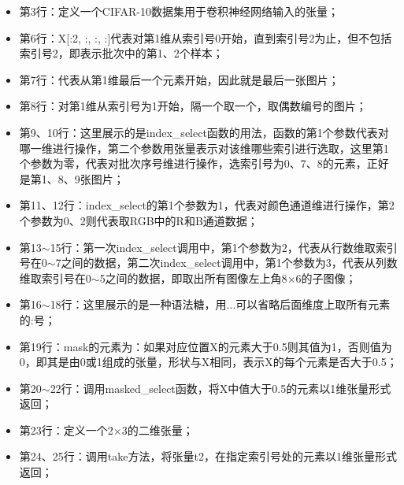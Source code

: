 \documentclass[UTF8]{article}
\begin{document}
\begin{itemize}
\item 第3行：定义一个CIFAR-10数据集用于卷积神经网络输入的张量；
\item 第6行：X[:2, :, :, :]代表对第1维从索引号0开始，直到索引号2为止，但不包括索引号2，即表示批次中的第1、2个样本；
\item 第7行：代表从第1维最后一个元素开始，因此就是最后一张图片；
\item 第8行：对第1维从索引号为1开始，隔一个取一个，取偶数编号的图片；
\item 第9、10行：这里展示的是index\_select函数的用法，函数的第1个参数代表对哪一维进行操作，第二个参数用张量表示对该维哪些索引进行选取，这里第1个参数为零，代表对批次序号维进行操作，选索引号为0、7、8的元素，正好是第1、8、9张图片；
\item 第11、12行：index\_select的第1个参数为1，代表对颜色通道维进行操作，第2个参数为0、2则代表取RGB中的R和B通道数据；
\item 第13$\sim$15行：第一次index\_select调用中，第1个参数为2，代表从行数维取索引号在0$\sim$7之间的数据，第二次index\_select调用中，第1个参数为3，代表从列数维取索引号在0$\sim$5之间的数据，即取出所有图像左上角8$\times$6的子图像；
\item 第16$\sim$18行：这里展示的是一种语法糖，用...可以省略后面维度上取所有元素的:号；
\item 第19行：mask的元素为：如果对应位置X的元素大于0.5则其值为1，否则值为0，即其是由0或1组成的张量，形状与X相同，表示X的每个元素是否大于0.5；
\item 第20$\sim$22行：调用masked\_select函数，将X中值大于0.5的元素以1维张量形式返回；
\item 第23行：定义一个2$\times$3的二维张量；
\item 第24、25行：调用take方法，将张量t2，在指定索引号处的元素以1维张量形式返回；
\end{itemize}
\end{document}
